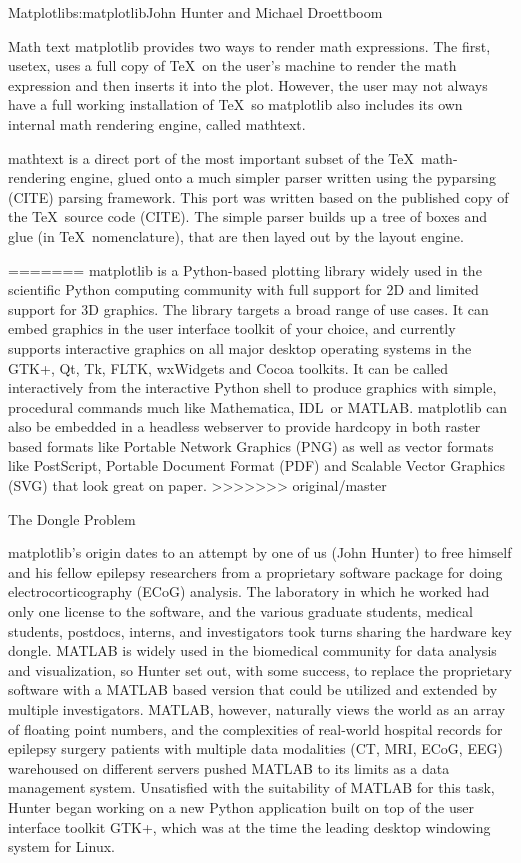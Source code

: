 \begin{aosachapter}{Matplotlib}{s:matplotlib}{John Hunter and Michael Droettboom}
\begin{aosasect1}{Math text}
matplotlib provides two ways to render math expressions.  The first,
usetex, uses a full copy of \TeX\ on the user's machine to render the
math expression and then inserts it into the plot.  However, the user
may not always have a full working installation of \TeX\, so
matplotlib also includes its own internal math rendering engine,
called mathtext.

mathtext is a direct port of the most important subset of the
\TeX\ math-rendering engine, glued onto a much simpler parser written
using the pyparsing (CITE) parsing framework.  This port was written
based on the published copy of the \TeX\ source code (CITE).  The
simple parser builds up a tree of boxes and glue (in
\TeX\ nomenclature), that are then layed out by the layout engine.

\end{aosasect1}
=======
matplotlib is a Python-based plotting library widely used in
the scientific Python computing community with full support for 2D and
limited support for 3D graphics.  The library targets a broad range of
use cases.  It can embed graphics in the user interface toolkit of
your choice, and currently supports interactive graphics on all major
desktop operating systems in the GTK+, Qt, Tk, FLTK, wxWidgets and
Cocoa toolkits.  It can be called interactively from the
interactive Python shell to produce graphics with simple, procedural
commands much like Mathematica\texttrademark, IDL\texttrademark\ or
MATLAB\texttrademark.  matplotlib can also be embedded in a headless
webserver to provide hardcopy in both raster based formats like
Portable Network Graphics (PNG) as well as vector formats like
PostScript, Portable Document Format (PDF) and Scalable Vector
Graphics (SVG) that look great on paper.
>>>>>>> original/master

\begin{aosasect1}{The Dongle Problem}

matplotlib's origin dates to an attempt by one of us (John Hunter) to
free himself and his fellow epilepsy researchers from a proprietary
software package for doing electrocorticography (ECoG) analysis.  The
laboratory in which he worked had only one license to the software,
and the various graduate students, medical students, postdocs, interns,
and investigators took turns sharing the hardware key dongle.
MATLAB is widely used in the biomedical community for
data analysis and visualization, so Hunter set out, with some success,
to replace the proprietary software with a MATLAB based version that
could be utilized and extended by multiple investigators.  MATLAB,
however, naturally views the world as an array of floating point
numbers, and the complexities of real-world hospital records for
epilepsy surgery patients with multiple data modalities (CT, MRI,
ECoG, EEG) warehoused on different servers pushed MATLAB to its limits
as a data management system.  Unsatisfied with the suitability of
MATLAB for this task, Hunter began working on a new Python application
built on top of the user interface toolkit GTK+, which was at the time
the leading desktop windowing system for Linux.


\end{aosasect1}
\end{aosachapter}
